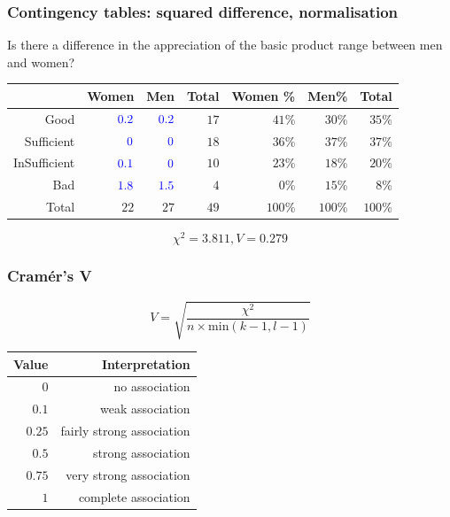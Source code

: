 \documentclass{beamer}
\begin{document}
\begin{frame}
  \frametitle{Contingency tables: squared difference, normalisation}
  Is there a difference in the appreciation of the basic product range between men and women?
  \begin{table}[h] \centering
    \begin{tabular}{@{}rrrrrrr@{}}
      \toprule
                   &                   Women &                     Men & Total & Women \% &   Men\% &   Total \\ \midrule
              Good & $\textcolor{blue}{0.2}$ & $\textcolor{blue}{0.2}$ &  $17$ &   $41$\% &  $30$\% &  $35$\% \\
        Sufficient &   $\textcolor{blue}{0}$ &   $\textcolor{blue}{0}$ &  $18$ &   $36$\% &  $37$\% &  $37$\% \\
      InSufficient & $\textcolor{blue}{0.1}$ &   $\textcolor{blue}{0}$ &  $10$ &   $23$\% &  $18$\% &  $20$\% \\
               Bad & $\textcolor{blue}{1.8}$ & $\textcolor{blue}{1.5}$ &   $4$ &    $0$\% &  $15$\% &   $8$\% \\
             Total &                    $22$ &                    $27$ &  $49$ &  $100$\% & $100$\% & $100$\% \\ \bottomrule
    \end{tabular}
  \end{table}
  \[ \chi^{2} = 3.811, V= 0.279 \]
\end{frame}

\begin{frame}
  \frametitle{Cramér's V}
  
  \[ V = \sqrt{\frac{\chi^2}{n \times \mathrm{min}(k - 1, l - 1)}} \]
  
  \begin{table}[h] \centering
    \begin{tabular}{@{}rr@{}}
    	\toprule
    	 Value &            Interpretation \\ \midrule
    	   $0$ &            no association \\
    	 $0.1$ &          weak association \\
    	$0.25$ & fairly strong association \\
    	 $0.5$ &        strong association \\
    	$0.75$ &   very strong association \\
    	   $1$ &      complete association \\ \bottomrule
    \end{tabular}
  \end{table}
\end{frame}
\end{document}
